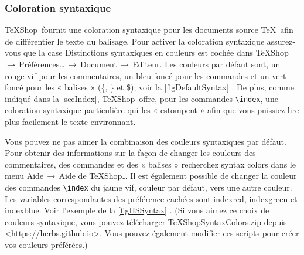 \documentclass[11pt,french]{article}
\newcommand{\TS}{\textsf{\TeX Shop}}
\newcommand{\cmd}[1]{\textsf{#1}}
\newcommand{\mnu}[1]{\textsf{#1}}
\newcommand{\To}{\,\(\to\)\,}
\begin{document}
\subsubsection{Coloration syntaxique}

%


\TS\ fournit une coloration syntaxique pour les documents source \TeX\ afin de différentier le texte du balisage. Pour activer la coloration syntaxique assurez-vous que la case \mnu{Distinctions syntaxiques en couleurs} est cochée dans \mnu{TeXShop}\To\mnu{Préférences…}\To\mnu{Document}\To\mnu{Editeur}. Les couleurs par défaut sont, un rouge vif pour les commentaires, un bleu foncé pour les commandes et un vert foncé pour les « balises » (\cmd{\{}, \cmd{\}} et \cmd{\$}); voir la \cref{figDefaultSyntax} . De plus, comme indiqué dans la \cref{secIndex}, \TS\ offre, pour les commandes \verb+\index+, une coloration syntaxique particulière qui les « estompent » afin que vous puissiez lire plus facilement le texte environnant.

Vous pouvez ne pas aimer la combinaison des couleurs syntaxiques par défaut. Pour obtenir des informations sur la façon de changer les couleurs des commentaires, des commandes et des « balises » recherchez \cmd{syntax colors} dans le menu \mnu{Aide}\To\mnu{Aide de TeXShop…} Il est également possible de changer la couleur des commandes \verb+\index+ du jaune vif, couleur par défaut, vers une autre couleur. Les variables correspondantes des préférence cachées sont \cmd{indexred}, \cmd{indexgreen} et \cmd{indexblue}. Voir l'exemple de la \cref{figHSSyntax} . (Si vous aimez ce choix de couleurs syntaxique, vous pouvez télécharger \cmd{TeXShopSyntaxColors.zip} depuis <\url{https://herbs.github.io}>. Vous pouvez également modifier ces scripts pour créer vos couleurs préférées.)
\end{document}
